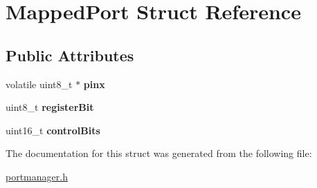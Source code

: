 \hypertarget{structMappedPort}{}\section{Mapped\+Port Struct Reference}
\label{structMappedPort}
\subsection*{Public Attributes}
\begin{DoxyCompactItemize}
\item 
\mbox{\label{structMappedPort_a504fc8fe2e91d886ed39d36a3c4e40f8}} 
volatile uint8\+\_\+t $\ast$ {\bfseries pinx}
\item 
\mbox{\label{structMappedPort_a5a906790bc9881785c9c166c8591dfc2}} 
uint8\+\_\+t {\bfseries register\+Bit}
\item 
\mbox{\label{structMappedPort_adf3e643dfa47b413740315ecf6b55e26}} 
uint16\+\_\+t {\bfseries control\+Bits}
\end{DoxyCompactItemize}


The documentation for this struct was generated from the following file\+:\begin{DoxyCompactItemize}
\item 
\hyperlink{portmanager_8h}{portmanager.\+h}\end{DoxyCompactItemize}
